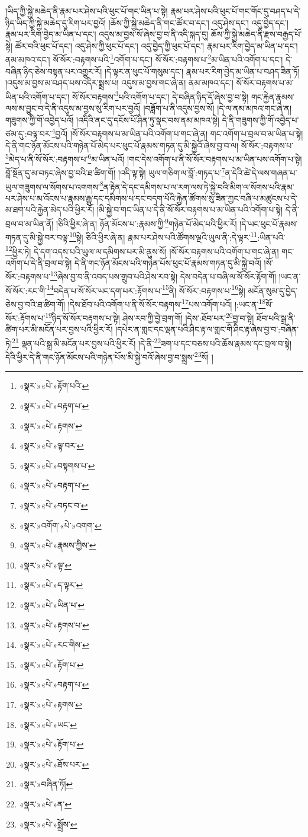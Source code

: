 །ཡིད་ཀྱི་སྐྱེ་མཆེད་ནི་རྣམ་པར་ཤེས་པའི་ཕུང་པོ་གང་ཡིན་པ་སྟེ། རྣམ་པར་ཤེས་པའི་ཕུང་པོ་གང་གོང་དུ་བཤད་པ་དེ་ཉིད་ཡིད་ཀྱི་སྐྱེ་མཆེད་དུ་རིག་པར་བྱའོ། །ཆོས་ཀྱི་སྐྱེ་མཆེད་ནི་གང་ཚོར་བ་དང་། འདུ་ཤེས་དང་། འདུ་བྱེད་དང་། རྣམ་པར་རིག་བྱེད་མ་ཡིན་པ་དང་། འདུས་མ་བྱས་སོ་ཞེས་བྱ་བ་ནི་འདི་སྐད་དུ། ཆོས་ཀྱི་སྐྱེ་མཆེད་ནི་རྫས་བརྒྱད་པོ་སྟེ། ཚོར་བའི་ཕུང་པོ་དང་། འདུ་ཤེས་ཀྱི་ཕུང་པོ་དང་། འདུ་བྱེད་ཀྱི་ཕུང་པོ་དང་། རྣམ་པར་རིག་བྱེད་མ་ཡིན་པ་དང་། ནམ་མཁའ་དང་། སོ་སོར་:བརྟགས་པའི་\footnote{«སྣར་»«པེ་»རྟོག་པའི་}འགོག་པ་དང་། སོ་སོར་:བརྟགས་པ་\footnote{«སྣར་»«པེ་»བརྟག་པ་}མ་ཡིན་པའི་འགོག་པ་དང་། དེ་བཞིན་ཉིད་ཅེས་བསྟན་པར་འགྱུར་རོ། །དེ་ལྟར་ན་ཕུང་པོ་གསུམ་དང་། རྣམ་པར་རིག་བྱེད་མ་ཡིན་པ་བཤད་ཟིན་ཏོ། །འདུས་མ་བྱས་མ་བཤད་པས་འདིར་སྨྲས་པ། འདུས་མ་བྱས་གང་ཞེ་ན། ནམ་མཁའ་དང་། སོ་སོར་བརྟགས་པ་མ་ཡིན་པའི་འགོག་པ་དང་། སོ་སོར་བརྟགས་\footnote{«སྣར་»«པེ་»རྟགས་}པའི་འགོག་པ་དང་། དེ་བཞིན་ཉིད་དོ་ཞེས་བྱ་བ་སྟེ། གང་རྐྱེན་རྣམས་ལས་མ་བྱུང་བ་དེ་ནི་འདུས་མ་བྱས་སུ་རིག་པར་བྱའོ། །བཟློག་པ་ནི་འདུས་བྱས་སོ། །དེ་ལ་ནམ་མཁའ་གང་ཞེ་ན། གཟུགས་ཀྱི་གོ་འབྱེད་པའོ། །འདིའི་ནང་དུ་དངོས་པོ་ཤིན་ཏུ་སྣང་བས་ནམ་མཁའ་སྟེ། དེ་ནི་གཟུགས་ཀྱི་གོ་འབྱེད་པ་ཙམ་དུ་:བལྟ་བར་\footnote{«སྣར་»«པེ་»ལྟ་བར་}བྱའོ། །སོ་སོར་བརྟགས་པ་མ་ཡིན་པའི་འགོག་པ་གང་ཞེ་ན། གང་འགོག་པ་བྲལ་བ་མ་ཡིན་པ་སྟེ། དེ་ནི་གང་ཉོན་མོངས་པའི་གཉེན་པོ་མེད་པར་ཕུང་པོ་རྣམས་གཏན་དུ་མི་སྐྱེའོ་ཞེས་བྱ་བ་ལ། སོ་སོར་:བརྟགས་པ་\footnote{«སྣར་»«པེ་»བསྟགས་པ་}མེད་པ་ནི་སོ་སོར་:བརྟགས་པ་\footnote{«སྣར་»«པེ་»བརྟག་པ་}མ་ཡིན་པའོ། །གང་དེས་འགོག་པ་ནི་སོ་སོར་བརྟགས་པ་མ་ཡིན་པས་འགོག་པ་སྟེ། བློ་སྔོན་དུ་མ་བཏང་ཞེས་བྱ་བའི་ཐ་ཚིག་གོ། །འདི་ལྟ་སྟེ། ཡུལ་གཅིག་ལ་བློ་:གཏད་པ་\footnote{«སྣར་»«པེ་»བཏང་བ་}ན་དེའི་ཚེ་དེ་ལས་གཞན་པ་ཡུལ་གཟུགས་ལ་སོགས་པ་འགགས་\footnote{«སྣར་»འགོག་«པེ་»འགག་}ན་རྟེན་དེ་དང་དམིགས་པ་ལ་རག་ལས་ཏེ་སྐྱེ་བའི་མིག་ལ་སོགས་པའི་རྣམ་པར་ཤེས་པ་མ་འོངས་པ་རྣམས་རྒྱུ་དང་དམིགས་པ་དང་བདག་པོའི་རྐྱེན་ཚོགས་སུ་ཟིན་ཀྱང་བཞི་པ་མཚུངས་པ་དེ་མ་ཐག་པའི་རྐྱེན་མེད་པའི་ཕྱིར་རོ། །མི་སྐྱེ་བ་གང་ཡིན་པ་དེ་ནི་སོ་སོར་བརྟགས་པ་མ་ཡིན་པའི་འགོག་པ་སྟེ། དེ་ནི་བྲལ་བ་མ་ཡིན་ནོ། །ཅིའི་ཕྱིར་ཞེ་ན། ཉོན་མོངས་པ་:རྣམས་ཀྱི་\footnote{«སྣར་»«པེ་»རྣམས་ཀྱིས་}གཉེན་པོ་མེད་པའི་ཕྱིར་རོ། །དེ་ཡང་ཕུང་པོ་རྣམས་གཏན་དུ་མི་སྐྱེ་བར་བལྟ་\footnote{«སྣར་»«པེ་»ལྟ་}སྟེ། ཅིའི་ཕྱིར་ཞེ་ན། རྣམ་པར་ཤེས་པའི་ཚོགས་ལྔའི་ཡུལ་ནི་:དེ་ལྟར་\footnote{«སྣར་»«པེ་»ད་ལྟར་}:ཡིན་པའི་\footnote{«སྣར་»«པེ་»ཡིན་པ་}ཕྱིར་ཏེ། དེ་དག་འདས་པའི་ཡུལ་ལ་དམིགས་པར་མི་ནུས་སོ། །སོ་སོར་བརྟགས་པའི་འགོག་པ་གང་ཞེ་ན། གང་འགོག་པ་དེ་ནི་བྲལ་བ་སྟེ། དེ་ནི་གང་ཉོན་མོངས་པའི་གཉེན་པོས་ཕུང་པོ་རྣམས་གཏན་དུ་མི་སྐྱེ་བའོ། །སོ་སོར་:བརྟགས་པ་\footnote{«སྣར་»«པེ་»རྟགས་པ་}ཞེས་བྱ་བ་ནི་འབད་པས་གྲུབ་པའི་ཤེས་རབ་སྟེ། དེས་བདེན་པ་བཞི་ལ་སོ་སོར་རྟོག་གོ། །ཡང་ན་སོ་སོར་:རང་གི་\footnote{«སྣར་»«པེ་»རང་གིས་}བདེན་པ་སོ་སོར་ཡང་དག་པར་:རྟོགས་པ་\footnote{«སྣར་»«པེ་»རྟོག་པ་}ནི། སོ་སོར་:བརྟགས་པ་\footnote{«སྣར་»«པེ་»བརྟག་པ་}སྟེ། མངོན་སུམ་དུ་བྱེད་ཅེས་བྱ་བའི་ཐ་ཚིག་གོ། །དེས་ཐོབ་པའི་འགོག་པ་ནི་སོ་སོར་བརྟགས་\footnote{«སྣར་»«པེ་»རྟགས་}པས་འགོག་པའོ། །:ཡང་ན་\footnote{«སྣར་»«པེ་»ཡང་}སོ་སོར་:རྟོགས་པ་\footnote{«སྣར་»«པེ་»རྟོག་པ་}ཉིད་སོ་སོར་བརྟགས་པ་སྟེ། ཤེས་རབ་ཀྱི་བྱེ་བྲག་གོ། །དེས་:ཐོབ་པར་\footnote{«སྣར་»«པེ་»ཐོས་པར་}བྱ་བ་སྟེ། ཐོབ་པའི་སྒྲ་ནི་ཚིག་པར་མི་མངོན་པར་བྱས་པའི་ཕྱིར་རོ། །དཔེར་ན་གླང་དང་ལྡན་པའི་ཤིང་རྟ་ལ་གླང་གི་ཤིང་རྟ་ཞེས་བྱ་བ་:བཞིན་ཏེ།\footnote{«སྣར་»བཞིན་ཏོ།} ལྡན་པའི་སྒྲ་མི་མངོན་པར་བྱས་པའི་ཕྱིར་རོ། །དེ་ནི་\footnote{«སྣར་»«པེ་»ན་}ཟག་པ་དང་བཅས་པའི་ཆོས་རྣམས་དང་བྲལ་བ་སྟེ། དེའི་ཕྱིར་དེ་ནི་གང་ཉོན་མོངས་པའི་གཉེན་པོས་མི་སྐྱེ་བའོ་ཞེས་བྱ་བ་སྨྲས་\footnote{«སྣར་»«པེ་»སྨྲོས་}སོ། །
